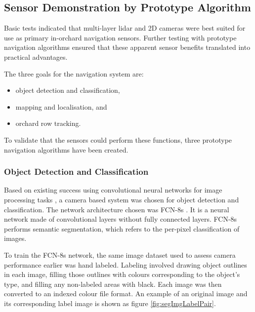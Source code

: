\documentclass[preprint,authoryear,12pt]{elsarticle}
\begin{document}
\subsection{Sensor Demonstration by Prototype Algorithm}

    Basic tests indicated that multi-layer lidar and 2D cameras were best suited for use as primary in-orchard navigation sensors.
    Further testing with prototype navigation algorithms ensured that these apparent sensor benefits translated into practical advantages.

    The three goals for the navigation system are:
    \begin{itemize}
        \item object detection and classification,
        \item mapping and localisation, and
        \item orchard row tracking.
    \end{itemize}
    To validate that the sensors could perform these functions, three prototype navigation algorithms have been created.

    \subsubsection{Object Detection and Classification}

        Based on existing success using convolutional neural networks for image processing tasks \citep{LeCun2015}, a camera based system was chosen for object detection and classification.
    	The network architecture chosen was FCN-8s \citep{long2015}.
        It is a neural network made of convolutional layers without fully connected layers.
    	FCN-8s performs semantic segmentation, which refers to the per-pixel classification of images.

        To train the FCN-8s network, the same image dataset used to assess camera performance earlier was hand labeled.
    	Labeling involved drawing object outlines in each image, filling those outlines with colours corresponding to the object's type, and filling any non-labeled areas with black.
        Each image was then converted to an indexed colour file format.
    	An example of an original image and its corresponding label image is shown as figure \ref{fig:segImgLabelPair}.
\end{document}
